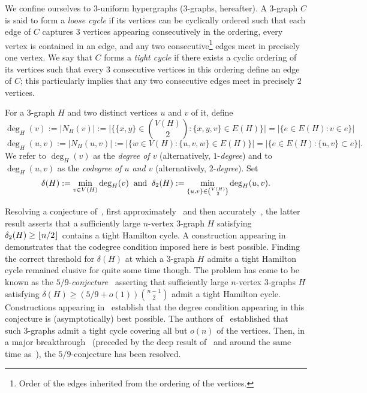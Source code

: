 \documentclass[11pt,reqno]{amsart}
\begin{document}
We confine ourselves to $3$-uniform hypergraphs ($3$-graphs, hereafter). 
A $3$-graph $C$ is said to form a {\em loose cycle} if its vertices can be cyclically ordered such that each edge of $C$ captures $3$ vertices appearing consecutively in the ordering, every vertex is contained in an edge, and any two consecutive\footnote{Order of the edges inherited from the ordering of the vertices.} edges meet in precisely one vertex. We say that $C$ forms a {\em tight cycle} if there exists a cyclic ordering of its vertices such that every $3$ consecutive vertices in this ordering define an edge of $C$; this particularly implies that any two consecutive edges meet in precisely $2$ vertices. 

For a $3$-graph $H$ and two distinct vertices $u$ and $v$ of it, define 
$$
\deg_H(v) := |N_H(v)| := \Big|\Big\{\{x,y\} \in \binom{V(H)}{2}: \{x,y,v\} \in E(H)\Big\}\Big| =|\{e \in E(H): v \in e\}| 
$$
$$
\deg_H(u,v) := |N_H(u,v)|:= |\{w \in V(H): \{u,v,w\} \in E(H)\}| =|\{e \in E(H): \{u,v\} \subset e\}|.
$$
We refer to $\deg_H(v)$ as the {\em degree of $v$} (alternatively, $1$-{\em degree}) and to $\deg_H(u,v)$ as the {\em codegree of $u$ and $v$} (alternatively, $2$-{\em degree}). Set 
$$
\delta(H) := \min_{v \in V(H)}\deg_H(v)\; \; \text{and}\;\; \delta_2(H) := \min_{\{u,v\} \in \binom{V(H)}{2}} \deg_H(u,v). 
$$

Resolving a conjecture of~\cite{Katona}, first approximately~\cite{RRS06} and then accurately~\cite{RRS11}, the latter result asserts that a sufficiently large $n$-vertex $3$-graph $H$ satisfying $\delta_2(H) \geq \left\lfloor n/2 \right\rfloor$ contains a tight Hamilton cycle. A construction appearing in~\cite{Katona} demonstrates that the  codegree condition imposed here is best possible. Finding the correct threshold for $\delta(H)$ at which a $3$-graph $H$ admits a tight Hamilton cycle remained elusive for quite some time though. The problem has come to be known as the $5/9$-{\em conjecture}~\cite[Conjecture~2.18]{RR10} asserting that sufficiently large $n$-vertex $3$-graphs $H$ satisfying $\delta(H) \geq (5/9+o(1))\binom{n-1}{2}$ admit a tight Hamilton cycle. Constructions appearing in~\cite{RR10,RR14} establish that 
the degree condition appearing in this conjecture is (asymptotically) best possible. The authors of~\cite{MC} established that such $3$-graphs admit a tight cycle covering all but $o(n)$ of the vertices. Then, in a major breakthrough~\cite{break} (preceded by the deep result of~\cite{Mathias3} and around the same time as~\cite{MC}), the $5/9$-conjecture has been resolved.
\end{document}
